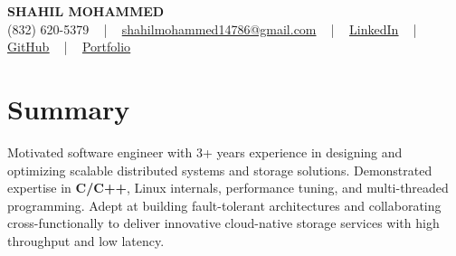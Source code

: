 \documentclass[letterpaper,10pt]{article}
\begin{document}
\begin{center}
    {\fontsize{14pt}{12pt}\selectfont \textbf{\MakeUppercase{Shahil Mohammed}}}\\ \vspace{2pt}
    \fontsize{10pt}{12pt}\selectfont (832) 620-5379 ~ | ~ \href{mailto:shahilmohammed14786@gmail.com}{shahilmohammed14786@gmail.com} ~ | ~  
    \href{https://www.linkedin.com/in/shahil-mohammed-9652931a1/}{\color{blue}\underline{LinkedIn}}  ~ | ~ 
    \href{https://github.com/freakbeast14}{\color{blue}\underline{GitHub}} ~ | ~ 
    \href{https://shahil-mohammed.netlify.app/}{\color{blue}\underline{Portfolio}}
    \vspace{-8pt}
\end{center}

\section{Summary}
\vspace{-2pt}\fontsize{8pt}{9pt}\selectfont
Motivated software engineer with 3+ years experience in designing and optimizing scalable distributed systems and storage solutions. Demonstrated expertise in \textbf{C/C++}, Linux internals, performance tuning, and multi-threaded programming. Adept at building fault-tolerant architectures and collaborating cross-functionally to deliver innovative cloud-native storage services with high throughput and low latency.
 \vspace{-5pt}
 
\vspace{-2pt}
\end{document}
